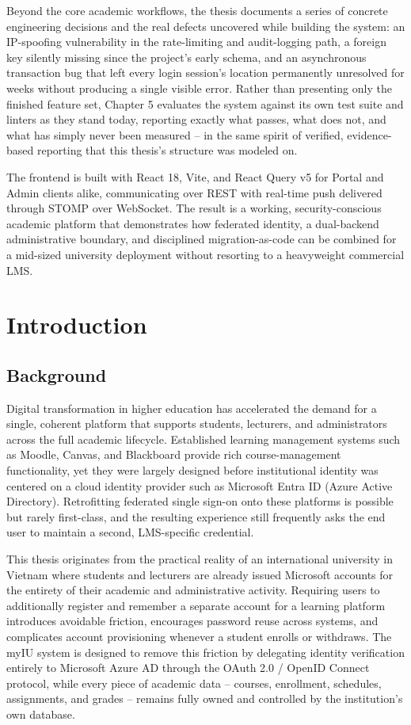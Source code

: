 \documentclass[12pt,a4paper]{report}
\begin{document}
Beyond the core academic workflows, the thesis documents a series of
concrete engineering decisions and the real defects uncovered while
building the system: an IP-spoofing vulnerability in the rate-limiting
and audit-logging path, a foreign key silently missing since the
project's early schema, and an asynchronous transaction bug that left
every login session's location permanently unresolved for weeks without
producing a single visible error. Rather than presenting only the
finished feature set, Chapter 5 evaluates the system against its own
test suite and linters as they stand today, reporting exactly what
passes, what does not, and what has simply never been measured --
in the same spirit of verified, evidence-based reporting that this
thesis's structure was modeled on.

The frontend is built with React 18, Vite, and React Query v5 for
Portal and Admin clients alike, communicating over REST with real-time
push delivered through STOMP over WebSocket. The result is a working,
security-conscious academic platform that demonstrates how federated
identity, a dual-backend administrative boundary, and disciplined
migration-as-code can be combined for a mid-sized university deployment
without resorting to a heavyweight commercial LMS.

\chapter{Introduction}

\section{Background}

Digital transformation in higher education has accelerated the demand
for a single, coherent platform that supports students, lecturers, and
administrators across the full academic lifecycle. Established learning
management systems such as Moodle, Canvas, and Blackboard provide rich
course-management functionality, yet they were largely designed before
institutional identity was centered on a cloud identity provider such
as Microsoft Entra ID (Azure Active Directory). Retrofitting federated
single sign-on onto these platforms is possible but rarely first-class,
and the resulting experience still frequently asks the end user to
maintain a second, LMS-specific credential.

This thesis originates from the practical reality of an international
university in Vietnam where students and lecturers are already issued
Microsoft accounts for the entirety of their academic and administrative
activity. Requiring users to additionally register and remember a
separate account for a learning platform introduces avoidable friction,
encourages password reuse across systems, and complicates account
provisioning whenever a student enrolls or withdraws. The myIU system is
designed to remove this friction by delegating identity verification
entirely to Microsoft Azure AD through the OAuth 2.0 / OpenID Connect
protocol, while every piece of academic data -- courses, enrollment,
schedules, assignments, and grades -- remains fully owned and controlled
by the institution's own database.
\end{document}
